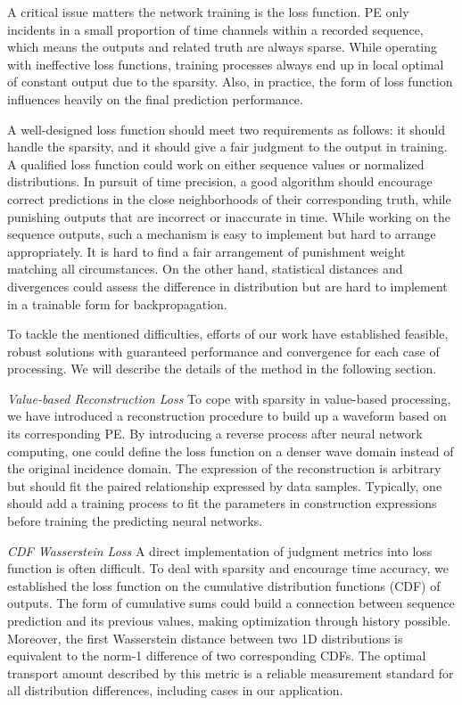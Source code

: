 
A critical issue matters the network training is the loss function. PE only incidents in a small proportion of time channels within a recorded sequence, which means the outputs and related truth are always sparse. While operating with ineffective loss functions, training processes always end up in local optimal of constant output due to the sparsity. Also, in practice, the form of loss function influences heavily on the final prediction performance. 

A well-designed loss function should meet two requirements as follows: it should handle the sparsity, and it should give a fair judgment to the output in training. A qualified loss function could work on either sequence values or normalized distributions. In pursuit of time precision, a good algorithm should encourage correct predictions in the close neighborhoods of their corresponding truth, while punishing outputs that are incorrect or inaccurate in time. While working on the sequence outputs, such a mechanism is easy to implement but hard to arrange appropriately. It is hard to find a fair arrangement of punishment weight matching all circumstances. On the other hand, statistical distances and divergences could assess the difference in distribution but are hard to implement in a trainable form for backpropagation. 

To tackle the mentioned difficulties, efforts of our work have established feasible, robust solutions with guaranteed performance and convergence for each case of processing. We will describe the details of the method in the following section.

\emph{Value-based Reconstruction Loss}
To cope with sparsity in value-based processing, we have introduced a reconstruction procedure to build up a waveform based on its corresponding PE. By introducing a reverse process after neural network computing, one could define the loss function on a denser wave domain instead of the original incidence domain. The expression of the reconstruction is arbitrary but should fit the paired relationship expressed by data samples. Typically, one should add a training process to fit the parameters in construction expressions before training the predicting neural networks.

\emph{CDF Wasserstein Loss}
A direct implementation of judgment metrics into loss function is often difficult. To deal with sparsity and encourage time accuracy, we established the loss function on the cumulative distribution functions (CDF) of outputs. The form of cumulative sums could build a connection between sequence prediction and its previous values, making optimization through history possible. Moreover, the first Wasserstein distance between two 1D distributions is equivalent to the norm-1 difference of two corresponding CDFs. The optimal transport amount described by this metric is a reliable measurement standard for all distribution differences, including cases in our application. 

